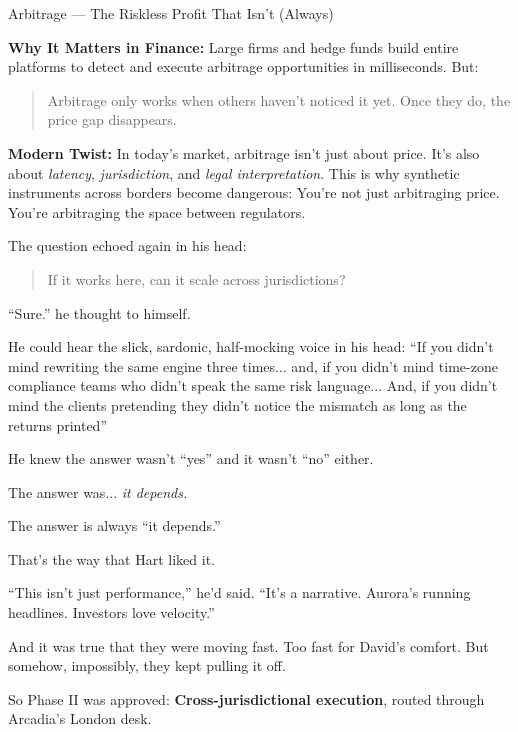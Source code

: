 \begin{TechnicalSidebar}{Arbitrage --- The Riskless Profit That Isn’t (Always)}
\medskip
    
    \textbf{Why It Matters in Finance:}  
    Large firms and hedge funds build entire platforms to detect and execute arbitrage opportunities in 
    milliseconds. But:
    
    \begin{quote}
      Arbitrage only works when others haven't noticed it yet. Once they do, the price gap disappears.
    \end{quote}
    
    \textbf{Modern Twist:}  
    In today’s market, arbitrage isn't just about price. It's also about \textit{latency}, 
    \textit{jurisdiction}, and \textit{legal interpretation}.  
    This is why synthetic instruments across borders become dangerous:  
    You're not just arbitraging price.  
    You're arbitraging the space between regulators.
    
\end{TechnicalSidebar}

\medskip

The question echoed again in his head:

\begin{quote}
    If it works here, can it scale across jurisdictions?
\end{quote}

``Sure.'' he thought to himself. 

He could hear the slick, sardonic, half-mocking voice in his head: ``If you didn’t mind rewriting 
the same engine three times... and,
if you didn’t mind time-zone compliance teams who didn’t speak the same risk language...
And, if you didn’t mind the clients pretending they didn’t notice the mismatch as long 
as the returns printed''

He knew the answer wasn’t ``yes'' and it wasn’t ``no'' either.

The answer was... 
\textit{it depends.}

The answer is always ``it depends.''

That's the way that Hart liked it.

``This isn’t just performance,'' he’d said. ``It’s a narrative. Aurora’s running headlines. Investors love 
velocity.''

And it was true that they were moving fast.
Too fast for David’s comfort.
But somehow, impossibly, they kept pulling it off.

So Phase II was approved:
\textbf{Cross-jurisdictional execution}, routed through Arcadia’s London desk.

